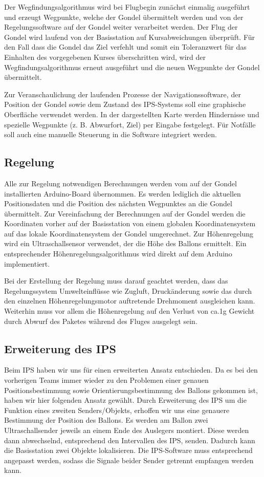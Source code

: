 \documentclass[lang=ngerman,inputenc=utf8,fontsize=10pt]{ldvarticle}
\begin{document}
Der Wegfindungsalgorithmus wird bei Flugbegin zunächst einmalig ausgeführt und erzeugt Wegpunkte, welche der Gondel übermittelt werden und von der Regelungssoftware auf der Gondel weiter verarbeitet werden. Der Flug der Gondel wird laufend von der Basisstation auf Kursabweichungen überprüft. Für den Fall dass die Gondel das Ziel verfehlt und somit ein Toleranzwert für das Einhalten des vorgegebenen Kurses überschritten wird, wird der Wegfindungsalgorithmus erneut ausgeführt und die neuen Wegpunkte der Gondel übermittelt.


Zur Veranschaulichung der laufenden Prozesse der Navigationssoftware, der Position der Gondel sowie dem Zustand des IPS-Systems soll eine graphische Oberfläche verwendet werden. In der dargestellten Karte werden Hindernisse und spezielle Wegpunkte (z. B. Abwurfort, Ziel) per Eingabe festgelegt. Für Notfälle soll auch eine manuelle Steuerung in die Software integriert werden.
\subsection*{Regelung}
Alle zur Regelung notwendigen Berechnungen werden vom auf der Gondel installierten Arduino-Board übernommen. Es werden lediglich die aktuellen Positionsdaten und die Position des nächsten Wegpunktes an die Gondel übermittelt. Zur Vereinfachung der Berechnungen auf der Gondel werden die Koordinaten vorher auf der Basisstation von einem globalen Koordinatensystem  auf das lokale Koordinatensystem der Gondel umgerechnet. Zur Höhenregelung wird ein Ultraschallsensor verwendet, der die Höhe des Ballons ermittelt. Ein entsprechender Höhenregelungsalgorithmus wird direkt auf dem Arduino implementiert.


Bei der Erstellung der Regelung muss darauf geachtet werden, dass das Regelungssystem Umwelteinflüsse wie Zugluft, Druckänderung sowie das durch den einzelnen Höhenregelungsmotor auftretende Drehmoment ausgleichen kann. Weiterhin muss vor allem die Höhenregelung auf den Verlust von ca.1g Gewicht durch Abwurf des Paketes während des Fluges ausgelegt sein.


\subsection*{Erweiterung des IPS}
Beim IPS haben wir uns für einen erweiterten Ansatz entschieden. Da es bei den vorherigen Teams immer wieder zu den Problemen einer genauen Positionsbestimmung sowie Orientierungsbestimmung des Ballons gekommen ist, haben wir hier folgenden Ansatz gewählt.
Durch Erweiterung des IPS um die Funktion eines zweiten Senders/Objekts, erhoffen wir uns eine genauere Bestimmung der Position des Ballons. Es werden am Ballon zwei Ultraschallsender jeweils an einem Ende des Auslegers montiert. Diese werden dann abwechselnd, entsprechend den Intervallen des IPS, senden. Dadurch kann die Basisstation zwei Objekte lokalisieren. Die IPS-Software muss entsprechend angepasst werden, sodass die Signale beider Sender getrennt empfangen werden kann.
\end{document}
